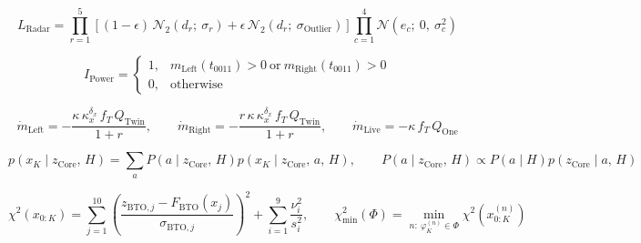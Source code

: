 \begin{equation}
  L_{\mathrm{Radar}} = \prod_{r=1}^{5} \left[ (1-\epsilon)\, \mathcal{N}_{2}\left(d_{r};\ \sigma_{r}\right) + \epsilon\, \mathcal{N}_{2}\left(d_{r};\ \sigma_{\mathrm{Outlier}}\right) \right] \prod_{c=1}^{4} \mathcal{N}\left(e_{c};\ 0,\ \sigma_{c}^{2}\right)
  \label{eq:7}
\end{equation}

\begin{equation}
  I_{\mathrm{Power}} = \begin{cases} 1, & m_{\mathrm{Left}}\left(t_{0011}\right) > 0 \ \text{or}\ m_{\mathrm{Right}}\left(t_{0011}\right) > 0 \\ 0, & \text{otherwise} \end{cases}
  \label{eq:8}
\end{equation}

\begin{equation}
  \dot{m}_{\mathrm{Left}} = -\frac{\kappa\, \kappa_{x}^{\delta_{x}}\, f_{T}\, Q_{\mathrm{Twin}}}{1+r}, \qquad \dot{m}_{\mathrm{Right}} = -\frac{r\, \kappa\, \kappa_{x}^{\delta_{x}}\, f_{T}\, Q_{\mathrm{Twin}}}{1+r}, \qquad \dot{m}_{\mathrm{Live}} = -\kappa\, f_{T}\, Q_{\mathrm{One}}
  \label{eq:9}
\end{equation}

\begin{equation}
  p\left(x_{K} \mid z_{\mathrm{Core}},\, H\right) = \sum_{a} P\left(a \mid z_{\mathrm{Core}},\, H\right) p\left(x_{K} \mid z_{\mathrm{Core}},\, a,\, H\right), \qquad P\left(a \mid z_{\mathrm{Core}},\, H\right) \propto P\left(a \mid H\right) p\left(z_{\mathrm{Core}} \mid a,\, H\right)
  \label{eq:10}
\end{equation}

\begin{equation}
  \chi^{2}\left(x_{0:K}\right) = \sum_{j=1}^{10} \left(\frac{z_{\mathrm{BTO},j} - F_{\mathrm{BTO}}\left(x_{j}\right)}{\sigma_{\mathrm{BTO},j}}\right)^{2} + \sum_{i=1}^{9} \frac{\nu_{i}^{2}}{s_{i}^{2}}, \qquad \chi_{\min}^{2}(\Phi) = \min_{n:\ \varphi_{K}^{(n)} \in \Phi} \chi^{2}\left(x_{0:K}^{(n)}\right)
  \label{eq:11}
\end{equation}

